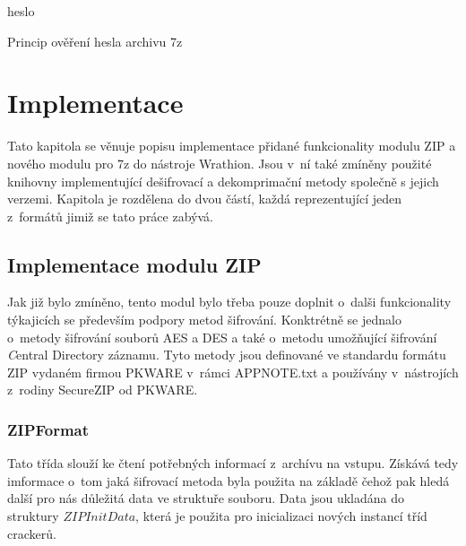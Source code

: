 \begin{algorithm}[ht]
    \SetStartEndCondition{ (}{)}{)}\SetAlgoBlockMarkers{}{}%
    \AlgoDisplayBlockMarkers\SetAlgoNoLine%
    \DontPrintSemicolon
    \Return heslo\;
    \caption{Princip ověření hesla archivu 7z}
    \label{alg:7z_desifr}
\end{algorithm}
    
\chapter{Implementace}
\label{ch:implementace}
Tato kapitola se věnuje popisu implementace přidané funkcionality modulu ZIP a nového modulu pro
7z do nástroje Wrathion. Jsou v~ní také zmíněny použité knihovny implementující dešifrovací a
dekomprimační metody společně s jejich verzemi. Kapitola je rozdělena do dvou částí, každá
reprezentující jeden z~formátů jimiž se tato práce zabývá.

\section{Implementace modulu ZIP}
Jak již bylo zmíněno, tento modul bylo třeba pouze doplnit o~dalši funkcionality týkajicích se 
především podpory metod šifrování. Konktrétně se jednalo o~metody šifrování souborů AES a DES a také
o~metodu umožňující šifrování {\textit Central Directory} záznamu. Tyto metody jsou definované ve
standardu formátu ZIP vydaném firmou PKWARE v~rámci APPNOTE.txt a používány
v~nástrojích z~rodiny SecureZIP od PKWARE.

\subsection{ZIPFormat}
Tato třída slouží ke čtení potřebných informací z~archívu na vstupu. Získává tedy imformace o~tom
jaká šifrovací metoda byla použita na základě čehož pak hledá další pro nás důležitá data ve
struktuře souboru. Data jsou ukladána do struktury $ZIPInitData$, která je použita pro
inicializaci nových instancí tříd crackerů. 

